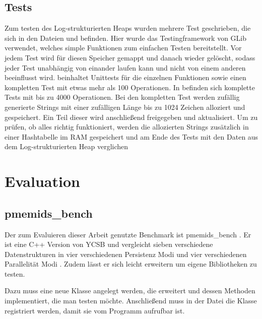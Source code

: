 \documentclass{class/thesis}
\begin{document}
\begin{thesis}
	
	
	\section{Tests}
	
	Zum testen des Log-strukturierten Heaps wurden mehrere Test geschrieben, die sich in den Dateien  und  befinden. 
	Hier wurde das Testingframework von GLib \cite{GLib} verwendet, welches simple Funktionen zum einfachen Testen bereitstellt.
	Vor jedem Test wird für diesen Speicher gemappt und danach wieder gelöscht, sodass jeder Test unabhängig von einander laufen kann und nicht von einem anderen beeinflusst wird.
	 beinhaltet Unittests für die einzelnen Funktionen sowie einen kompletten Test mit etwas mehr als 100 Operationen. 
	In  befinden sich komplette Tests mit bis zu 4000 Operationen.
	Bei den kompletten Test werden zufällig generierte Strings mit einer zufälligen Länge bis zu 1024 Zeichen alloziert und gespeichert.
	Ein Teil dieser wird anschließend freigegeben und aktualisiert.
	Um zu prüfen, ob alles richtig funktioniert, werden die allozierten Strings zusätzlich in einer Hashtabelle im RAM gespeichert und am Ende des Tests mit den Daten aus dem Log-strukturierten Heap verglichen
	



	\chapter{Evaluation}
	
	\section{pmemids\_bench} \label{pmemids_bench}
	
	Der zum Evaluieren dieser Arbeit genutzte Benchmark ist \glqq{}pmemids\_bench\grqq{} \cite{Islam:2020}\cite{Bench:Git}. 
	Er ist eine C++ Version von YCSB und vergleicht sieben verschiedene Datenstrukturen in vier verschiedenen Persistenz Modi und vier verschiedenen Parallelität Modi \cite{Bench:Git}. 
	Zudem lässt er sich leicht erweitern um eigene Bibliotheken zu testen.
	
	Dazu muss eine neue Klasse angelegt werden, die  erweitert und dessen Methoden implementiert, die man testen möchte.
	Anschließend muss in der Datei  die Klasse registriert werden, damit sie vom Programm aufrufbar ist.
	

\end{thesis}
\end{document}
